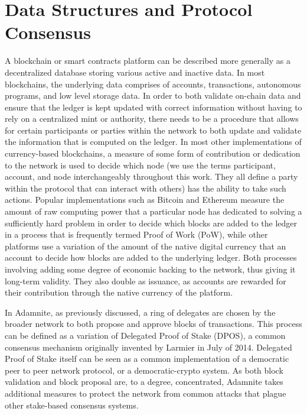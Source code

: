 \documentclass[conference]{IEEEtran}
\begin{document}
\section{Data Structures and Protocol Consensus}
A blockchain or smart contracts platform can be described more generally as a decentralized database storing various active and inactive data. In most blockchains, the underlying data comprises of accounts, transactions, autonomous programs, and low level storage data. In order to both validate on-chain data and ensure that the ledger is kept updated with correct information without having to rely on a centralized mint or authority, there needs to be a procedure that allows for certain participants or parties within the network to both update and validate the information that is computed on the ledger. In most other implementations of currency-based blockchains, a measure of some form of contribution or dedication to the network is used to decide which node (we use the terms participant, account, and node interchangeably throughout this work. They all define a party within the protocol that can interact with others) has the ability to take such actions. Popular implementations such as Bitcoin and Ethereum measure the amount of raw computing power that a particular node has dedicated to solving a sufficiently hard problem in order to decide which blocks are added to the ledger in a process that is frequently termed Proof of Work (PoW), while other platforms use a variation of the amount of the native digital currency that an account to decide how blocks are added to the underlying ledger. Both processes involving adding some degree of economic backing to the network, thus giving it long-term validity. They also double as issuance, as accounts are rewarded for their contribution through the native currency of the platform.

In Adamnite, as previously discussed, a ring of delegates are chosen by the broader network to both propose and approve blocks of transactions. This process can be defined as a variation of Delegated Proof of Stake (DPOS), a common consensus mechanism originally invented by Larmier \cite{Larmier2014DPOS} in July of 2014. Delegated Proof of Stake itself can be seen as a common implementation of a democratic peer to peer network protocol, or a democratic-crypto system. As both block validation and block proposal are, to a degree, concentrated, Adamnite takes additional measures to protect the network from common attacks that plague other stake-based consensus systems.
\end{document}

